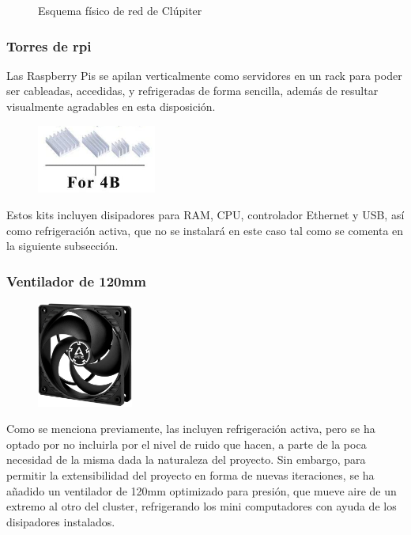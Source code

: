 \begin{figure}[H]
  \centering
  \vspace*{0.5cm}
  \def\svgwidth{0.87\textwidth}
  
  \caption{Esquema físico de red de Clúpiter}
  \label{fig:raspi_diagram_eth}
\end{figure}

\subsubsection{Torres de \acrshort{rpi}}
\label{sssec:torresrpi}
Las Raspberry Pis se apilan verticalmente como servidores en un rack para poder ser cableadas, accedidas, y refrigeradas de forma sencilla, además de resultar visualmente agradables en esta disposición.

\begin{figure}
  \vspace*{-0.3cm}
  \centering
  \includegraphics[width=0.35\textwidth]{img/disipadores-rpi-4b.png}
  \label{fig:rpi4b-disipadores}
\end{figure}
Estos kits incluyen disipadores para RAM, CPU, controlador Ethernet y USB, así como refrigeración activa, que no se instalará en este caso tal como se comenta en la siguiente subsección.




\subsubsection{Ventilador de 120mm}
\begin{figure}
  \centering
  \includegraphics[width=0.28\textwidth]{img/arctic-fan.jpg}
  \label{fig:arctic-fan}
\end{figure}
Como se menciona previamente, las  incluyen refrigeración activa, pero se ha optado por no incluirla por el nivel de ruido que hacen, a parte de la poca necesidad de la misma dada la naturaleza del proyecto. Sin embargo, para permitir la extensibilidad del proyecto en forma de nuevas iteraciones, se ha añadido un ventilador de 120mm optimizado para presión, que mueve aire de un extremo al otro del cluster, refrigerando los mini computadores con ayuda de los disipadores instalados.

